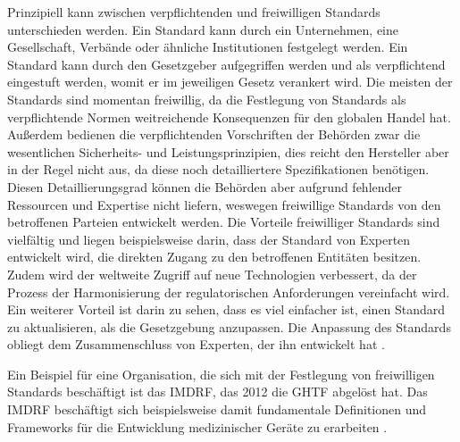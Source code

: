 \documentclass[a4paper,12pt]{report}
\begin{document}
Prinzipiell kann zwischen verpflichtenden und freiwilligen Standards unterschieden werden. Ein Standard kann durch ein Unternehmen, eine Gesellschaft, Verbände oder ähnliche Institutionen festgelegt werden. Ein Standard kann durch den Gesetzgeber aufgegriffen werden und als verpflichtend eingestuft werden, womit er im jeweiligen Gesetz verankert wird. Die meisten der Standards sind momentan freiwillig, da die Festlegung von Standards als verpflichtende Normen weitreichende Konsequenzen für den globalen Handel hat. Außerdem bedienen die verpflichtenden Vorschriften der Behörden zwar die wesentlichen Sicherheits- und Leistungsprinzipien, dies reicht den Hersteller aber in der Regel nicht aus, da diese noch detailliertere Spezifikationen benötigen. Diesen Detaillierungsgrad können die Behörden aber aufgrund fehlender Ressourcen und Expertise nicht liefern, weswegen freiwillige Standards von den betroffenen Parteien entwickelt werden. Die Vorteile freiwilliger Standards sind vielfältig und liegen beispielsweise darin, dass der Standard von Experten entwickelt wird, die direkten Zugang zu den betroffenen Entitäten besitzen. Zudem wird der weltweite Zugriff auf neue Technologien verbessert, da der Prozess der Harmonisierung der regulatorischen Anforderungen vereinfacht wird. Ein weiterer Vorteil ist darin zu sehen, dass es viel einfacher ist, einen Standard zu aktualisieren, als die Gesetzgebung anzupassen. Die Anpassung des Standards obliegt dem Zusammenschluss von Experten, der ihn entwickelt hat \citep[vgl.][S. 19-22]{Cheng2003}.

Ein Beispiel für eine Organisation, die sich mit der Festlegung von freiwilligen Standards beschäftigt ist das \ac{IMDRF}, das 2012 die \ac{GHTF} abgelöst hat. Das \ac{IMDRF} beschäftigt sich beispielsweise damit fundamentale Definitionen und Frameworks für die Entwicklung medizinischer Geräte zu erarbeiten \citep[vgl.][]{Hall2014}.
\end{document}
